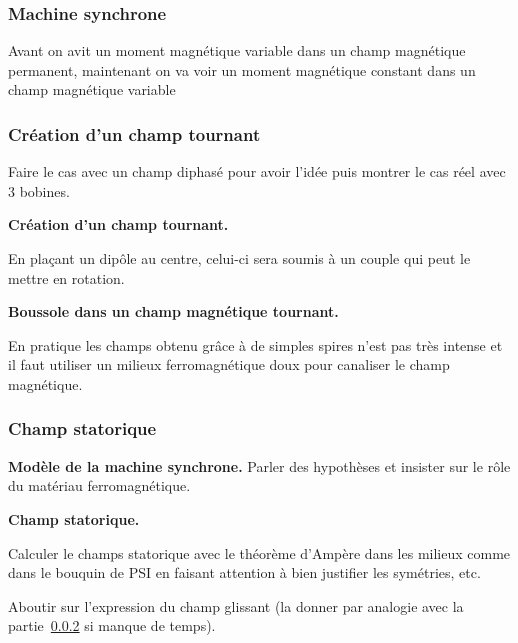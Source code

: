 \subsubsection{Machine synchrone}

Avant on avit un moment magnétique variable dans un champ magnétique permanent, maintenant on va voir un moment magnétique constant dans un champ magnétique variable

\subsubsection{Création d'un champ tournant}
\label{sec:lp09_rotating_field}

Faire le cas avec un champ diphasé pour avoir l'idée puis montrer le cas réel avec 3 bobines.

\begin{slide}
\textbf{Création d'un champ tournant.}
\end{slide}

En plaçant un dipôle au centre, celui-ci sera soumis à un couple qui peut le mettre en rotation.

\begin{experience}
\textbf{Boussole dans un champ magnétique tournant.}
\end{experience}

\begin{transition}
En pratique les champs obtenu grâce à de simples spires n'est pas très intense et il faut utiliser un milieux ferromagnétique doux pour canaliser le champ magnétique.
\end{transition}

\subsubsection{Champ statorique}

\begin{slide}
\textbf{Modèle de la machine synchrone.}
Parler des hypothèses et insister sur le rôle du matériau ferromagnétique.
\end{slide}

\begin{slide}
\textbf{Champ statorique.}
\end{slide}

Calculer le champs statorique avec le théorème d'Ampère dans les milieux comme dans le bouquin de PSI en faisant attention à bien justifier les symétries, etc.

Aboutir sur l'expression du champ glissant (la donner par analogie avec la partie~\ref{sec:lp09_rotating_field} si manque de temps).

